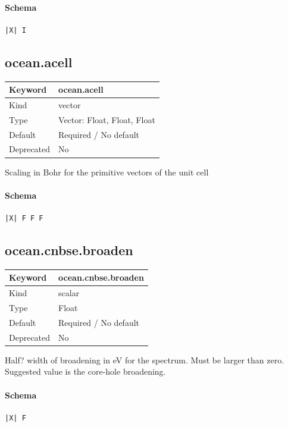 \documentclass[11pt]{article}
\begin{document}
{{{{{\paragraph{Schema}
\begin{Verbatim}
|X| I
\end{Verbatim}

\subsection{ocean.acell}
\label{kw:ocean-acell}
\begin{longtable}{|p{1.5in}|p{4.5in}|}
\hline
Keyword & ocean.acell \\
\hline
Kind & vector \\
\hline
Type & Vector: Float, Float, Float \\
\hline
Default & Required / No default \\
\hline
Deprecated & No \\
\hline
\end{longtable}
 Scaling in Bohr for the primitive vectors of the unit cell

\paragraph{Schema}
\begin{Verbatim}
|X| F F F
\end{Verbatim}

\subsection{ocean.cnbse.broaden}
\label{kw:ocean-cnbse-broaden}
\begin{longtable}{|p{1.5in}|p{4.5in}|}
\hline
Keyword & ocean.cnbse.broaden \\
\hline
Kind & scalar \\
\hline
Type & Float \\
\hline
Default & Required / No default \\
\hline
Deprecated & No \\
\hline
\end{longtable}
 Half? width of broadening in eV for the spectrum. Must be larger than zero.
 Suggested value is the core-hole broadening.

\paragraph{Schema}
\begin{Verbatim}
|X| F
\end{Verbatim}

}}}}}
\end{document}
